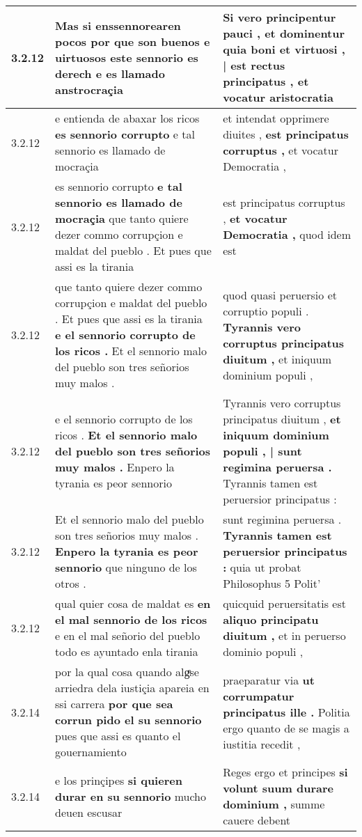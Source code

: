 \begin{tabular}{|p{1cm}|p{6.5cm}|p{6.5cm}|}
3.2.12 & Mas si enssennorearen pocos \textbf{ por que son buenos e uirtuosos este sennorio es derech } e es llamado anstrocraçia & Si vero principentur pauci , \textbf{ et dominentur quia boni et virtuosi , | est rectus principatus , } et vocatur aristocratia \\\hline
3.2.12 & e entienda de abaxar los ricos \textbf{ es sennorio corrupto } e tal sennorio es llamado de mocraçia & et intendat opprimere diuites , \textbf{ est principatus corruptus , } et vocatur Democratia , \\\hline
3.2.12 & es sennorio corrupto \textbf{ e tal sennorio es llamado de mocraçia } que tanto quiere dezer commo corrupçion e maldat del pueblo . Et pues que assi es la tirania & est principatus corruptus , \textbf{ et vocatur Democratia , } quod idem est \\\hline
3.2.12 & que tanto quiere dezer commo corrupçion e maldat del pueblo . Et pues que assi es la tirania \textbf{ e el sennorio corrupto de los ricos . } Et el sennorio malo del pueblo son tres señorios muy malos . & quod quasi peruersio et corruptio populi . \textbf{ Tyrannis vero corruptus principatus diuitum , } et iniquum dominium populi , \\\hline
3.2.12 & e el sennorio corrupto de los ricos . \textbf{ Et el sennorio malo del pueblo son tres señorios muy malos . } Enpero la tyrania es peor sennorio & Tyrannis vero corruptus principatus diuitum , \textbf{ et iniquum dominium populi , | sunt regimina peruersa . } Tyrannis tamen est peruersior principatus : \\\hline
3.2.12 & Et el sennorio malo del pueblo son tres señorios muy malos . \textbf{ Enpero la tyrania es peor sennorio } que ninguno de los otros . & sunt regimina peruersa . \textbf{ Tyrannis tamen est peruersior principatus : } quia ut probat Philosophus 5 Polit’ \\\hline
3.2.12 & qual quier cosa de maldat es \textbf{ en el mal sennorio de los ricos } e en el mal señorio del pueblo todo es ayuntado enla tirania & quicquid peruersitatis est \textbf{ aliquo principatu diuitum , } et in peruerso dominio populi , \\\hline
3.2.14 & por la qual cosa quando algͤse arriedra dela iustiçia apareia en ssi carrera \textbf{ por que sea corrun pido el su sennorio } pues que assi es quanto el gouernamiento & praeparatur via \textbf{ ut corrumpatur principatus ille . } Politia ergo quanto de se magis a iustitia recedit , \\\hline
3.2.14 & e los prinçipes \textbf{ si quieren durar en su sennorio } mucho deuen escusar & Reges ergo et principes \textbf{ si volunt suum durare dominium , } summe cauere debent \\\hline

\end{tabular}
